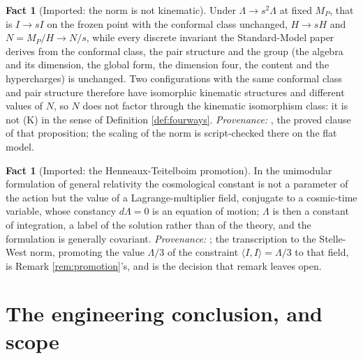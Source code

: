 \documentclass[11pt]{article}
\theoremstyle{definition}
\newtheorem{fact}[theorem]{Fact}
\newcommand{\ip}[2]{\langle #1, #2\rangle}
\begin{document}
\begin{fact}[Imported: the norm is not kinematic]\label{fact:notkinematic}
Under $\Lambda \to s^2\Lambda$ at fixed $M_P$, that is $I \to sI$ on the frozen point with the conformal class unchanged, $H \to sH$ and $N = M_P/H \to N/s$, while every discrete invariant the Standard-Model paper derives from the conformal class, the pair structure and the group (the algebra and its dimension, the global form, the dimension four, the content and the hypercharges) is unchanged. Two configurations with the same conformal class and pair structure therefore have isomorphic kinematic structures and different values of $N$, so $N$ does not factor through the kinematic isomorphism class: it is not (K) in the sense of Definition \ref{def:fourways}. \emph{Provenance:} \cite[Prop.~7.6(1)]{ButlerT12}, the proved clause of that proposition; the scaling of the norm is script-checked there on the flat model.
\end{fact}

\begin{fact}[Imported: the Henneaux-Teitelboim promotion]\label{fact:ht}
In the unimodular formulation of general relativity the cosmological constant is not a parameter of the action but the value of a Lagrange-multiplier field, conjugate to a cosmic-time variable, whose constancy $d\Lambda = 0$ is an equation of motion; $\Lambda$ is then a constant of integration, a label of the solution rather than of the theory, and the formulation is generally covariant. \emph{Provenance:} \cite{HenneauxTeitelboim1989}; the transcription to the Stelle-West norm, promoting the value $\Lambda/3$ of the constraint $\ip{I}{I} = \Lambda/3$ to that field, is Remark \ref{rem:promotion}'s, and is the decision that remark leaves open.
\end{fact}

\section{The engineering conclusion, and scope}\label{sec:verdict}
\end{document}
